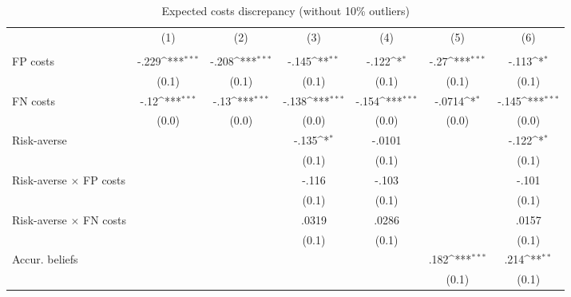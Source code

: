 \begin{table}[htbp]\centering
\def\sym#1{\ifmmode^{#1}\else\(^{#1}\)\fi}
\caption{Expected costs discrepancy (without 10\% outliers)}
\begin{tabular}{l*{6}{c}}
\hline\hline
                &\multicolumn{1}{c}{(1)}&\multicolumn{1}{c}{(2)}&\multicolumn{1}{c}{(3)}&\multicolumn{1}{c}{(4)}&\multicolumn{1}{c}{(5)}&\multicolumn{1}{c}{(6)}\\
                &\multicolumn{1}{c}{}&\multicolumn{1}{c}{}&\multicolumn{1}{c}{}&\multicolumn{1}{c}{}&\multicolumn{1}{c}{}&\multicolumn{1}{c}{}\\
\hline
FP costs        &    -.229\sym{***}&    -.208\sym{***}&    -.145\sym{**} &    -.122\sym{*}  &     -.27\sym{***}&    -.113\sym{*}  \\
                &    (0.1)         &    (0.1)         &    (0.1)         &    (0.1)         &    (0.1)         &    (0.1)         \\
FN costs        &     -.12\sym{***}&     -.13\sym{***}&    -.138\sym{***}&    -.154\sym{***}&   -.0714\sym{*}  &    -.145\sym{***}\\
                &    (0.0)         &    (0.0)         &    (0.0)         &    (0.0)         &    (0.0)         &    (0.0)         \\
Risk-averse     &                  &                  &    -.135\sym{*}  &   -.0101         &                  &    -.122\sym{*}  \\
                &                  &                  &    (0.1)         &    (0.1)         &                  &    (0.1)         \\
Risk-averse $\times$ FP costs&                  &                  &    -.116         &    -.103         &                  &    -.101         \\
                &                  &                  &    (0.1)         &    (0.1)         &                  &    (0.1)         \\
Risk-averse $\times$ FN costs&                  &                  &    .0319         &    .0286         &                  &    .0157         \\
                &                  &                  &    (0.1)         &    (0.1)         &                  &    (0.1)         \\
Accur. beliefs  &                  &                  &                  &                  &     .182\sym{***}&     .214\sym{**} \\
                &                  &                  &                  &                  &    (0.1)         &    (0.1)         \\

\end{tabular}
\end{table}
